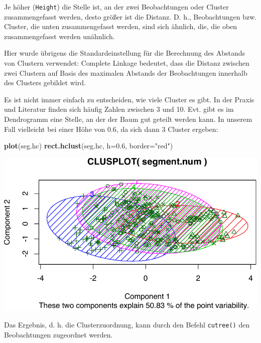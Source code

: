 \documentclass[12pt,]{book}
\newenvironment{Shaded}{\begin{snugshade}}{\end{snugshade}}
\newcommand{\KeywordTok}[1]{\textcolor[rgb]{0.13,0.29,0.53}{\textbf{{#1}}}}
\newcommand{\DataTypeTok}[1]{\textcolor[rgb]{0.13,0.29,0.53}{{#1}}}
\newcommand{\DecValTok}[1]{\textcolor[rgb]{0.00,0.00,0.81}{{#1}}}
\newcommand{\FloatTok}[1]{\textcolor[rgb]{0.00,0.00,0.81}{{#1}}}
\newcommand{\StringTok}[1]{\textcolor[rgb]{0.31,0.60,0.02}{{#1}}}
\newcommand{\NormalTok}[1]{{#1}}
\begin{document}
Je höher (\texttt{Height}) die Stelle ist, an der zwei Beobachtungen
oder Cluster zusammengefasst werden, desto größer ist die Distanz. D.
h., Beobachtungen bzw. Cluster, die unten zusammengefasst werden, sind
sich ähnlich, die, die oben zusammengefasst werden unähnlich.

Hier wurde übrigens die Standardeinstellung für die Berechnung des
Abstands von Clustern verwendet: Complete Linkage bedeutet, dass die
Distanz zwischen zwei Clustern auf Basis des maximalen Abstands der
Beobachtungen innerhalb des Clusters gebildet wird.

Es ist nicht immer einfach zu entscheiden, wie viele Cluster es gibt. In
der Praxis und Literatur finden sich häufig Zahlen zwischen 3 und 10.
Evt. gibt es im Dendrogramm eine Stelle, an der der Baum gut geteilt
werden kann. In unserem Fall vielleicht bei einer Höhe von \(0.6\), da
sich dann 3 Cluster ergeben:

\begin{Shaded}
\begin{Highlighting}[]
\KeywordTok{plot}\NormalTok{(seg.hc)}
\KeywordTok{rect.hclust}\NormalTok{(seg.hc, }\DataTypeTok{h=}\FloatTok{0.6}\NormalTok{, }\DataTypeTok{border=}\StringTok{"red"}\NormalTok{)}
\end{Highlighting}
\end{Shaded}

\begin{center}\includegraphics[width=0.7\linewidth]{082_Clusteranalyse_files/figure-latex/unnamed-chunk-10-1} \end{center}

Das Ergebnis, d. h. die Clusterzuordnung, kann durch den Befehl
\texttt{cutree()} den Beobachtungen zugeordnet werden.

\begin{Shaded}
\end{Shaded}
\end{document}
